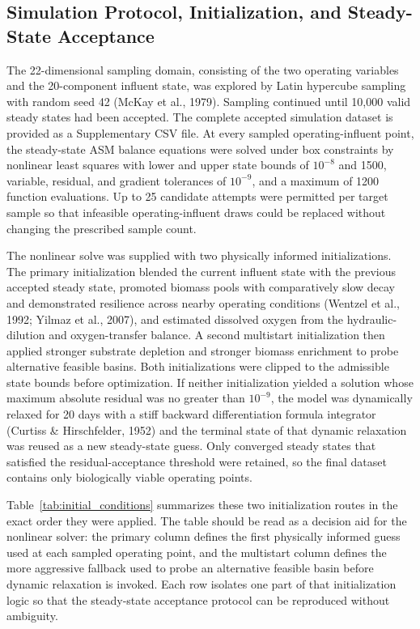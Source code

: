 \documentclass[a4paper,fleqn]{cas-sc}
\newenvironment{revblock}{\begingroup\color{revDefault}}{\endgroup}
\newenvironment{revblockr116}{\begingroup\color{revRoneSixteen}}{\endgroup}
\begin{document}
\begin{revblock}
\begin{revblockr116}
\subsection{Simulation Protocol, Initialization, and Steady-State Acceptance}

The 22-dimensional sampling domain, consisting of the two operating variables and the 20-component influent state, was explored by Latin hypercube sampling with random seed 42 (McKay et al., 1979). Sampling continued until 10,000 valid steady states had been accepted. The complete accepted simulation dataset is provided as a Supplementary CSV file. At every sampled operating-influent point, the steady-state ASM balance equations were solved under box constraints by nonlinear least squares with lower and upper state bounds of $10^{-8}$ and 1500, variable, residual, and gradient tolerances of $10^{-9}$, and a maximum of 1200 function evaluations. Up to 25 candidate attempts were permitted per target sample so that infeasible operating-influent draws could be replaced without changing the prescribed sample count.

The nonlinear solve was supplied with two physically informed initializations. The primary initialization blended the current influent state with the previous accepted steady state, promoted biomass pools with comparatively slow decay and demonstrated resilience across nearby operating conditions (Wentzel et al., 1992; Yilmaz et al., 2007), and estimated dissolved oxygen from the hydraulic-dilution and oxygen-transfer balance. A second multistart initialization then applied stronger substrate depletion and stronger biomass enrichment to probe alternative feasible basins. Both initializations were clipped to the admissible state bounds before optimization. If neither initialization yielded a solution whose maximum absolute residual was no greater than $10^{-9}$, the model was dynamically relaxed for 20 days with a stiff backward differentiation formula integrator (Curtiss \& Hirschfelder, 1952) and the terminal state of that dynamic relaxation was reused as a new steady-state guess. Only converged steady states that satisfied the residual-acceptance threshold were retained, so the final dataset contains only biologically viable operating points.

Table~\ref{tab:initial_conditions} summarizes these two initialization routes in the exact order they were applied. The table should be read as a decision aid for the nonlinear solver: the primary column defines the first physically informed guess used at each sampled operating point, and the multistart column defines the more aggressive fallback used to probe an alternative feasible basin before dynamic relaxation is invoked. Each row isolates one part of that initialization logic so that the steady-state acceptance protocol can be reproduced without ambiguity.


\end{revblockr116}
\end{revblock}
\end{document}
